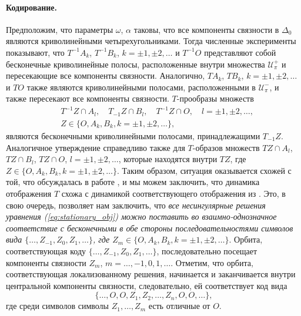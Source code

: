\paragraph{Кодирование.}
Предположим, что параметры $\omega$, $\alpha$ таковы, что все компоненты связности в $\Delta_0$ являются криволинейными четырехугольниками.
Тогда численные эксперименты показывают, что $T^{-1} A_k$, $T^{-1} B_k$, $k = \pm 1, \pm 2, \dots$ и $T^{-1} O$ представляют собой бесконечные криволинейные полосы, расположенные внутри множества $\mathcal{U}_{\pi}^+$ и пересекающие все компоненты связности.
Аналогично, $TA_k$, $TB_k$, $k = \pm 1, \pm 2, \dots$ и $TO$ также являются криволинейными полосами, расположенными в $\mathcal{U}_{\pi}^-$, и также пересекают все компоненты связности.
$T$-прообразы множеств
%
\begin{eqnarray*}
& T^{-1} Z \cap A_l, \quad T_{-1} Z \cap B_l, \quad T^{-1} Z \cap O, \quad l = \pm 1, \pm 2, \dots, \\
& Z \in \{ O, A_k, B_k, k = \pm 1, \pm 2, \dots \},
\end{eqnarray*}
%
являются бесконечными криволинейными полосами, принадлежащими $T_{-1} Z$.
Аналогичное утверждение справедливо также для $T$-образов множеств $TZ \cap A_l$, $TZ \cap B_l$, $TZ \cap O$, $l = \pm 1, \pm 2, \dots$, которые находятся внутри $TZ$, где $Z \in \{ O, A_k, B_k, k = \pm 1, \pm 2, \dots \}$.
Таким образом, ситуация оказывается схожей с той, что обсуждалась в работе \cite{AlfAvr}, и мы можем заключить, что динамика отображения $T$ схожа с динамикой соответствующего отображения из \cite{AlfAvr}.
Это, в свою очередь, позволяет нам заключить, что {\it все несингулярные решения уравнения (\ref{eq:stationary_obj}) можно поставить во взаимно-однозначное соответствие с бесконечными в обе стороны последовательностями символов вида $\{ \dots, Z_{-1}, Z_0, Z_1, \dots \}$, где $Z_m \in \{ O, A_k, B_k, k = \pm 1, \pm 2, \dots \}$}.
Орбита, соответствующая коду $\{ \dots, Z_{-1}, Z_0, Z_1 ,\dots\}$, последовательно посещает компоненты связности $Z_m$, $m = \dots, -1, 0, 1, \dots$.
Отметим, что орбита, соответствующая локализованному решения, начинается и заканчивается внутри центральной компоненты связности, следовательно, ей соответствует код вида
%
\begin{equation*}
\{ \dots, O, O, Z_1, Z_2, \dots, Z_n, O, O, \dots \},
\end{equation*}
%
где среди символов символы $Z_1, \dots, Z_m$ есть отличные от $O$.

